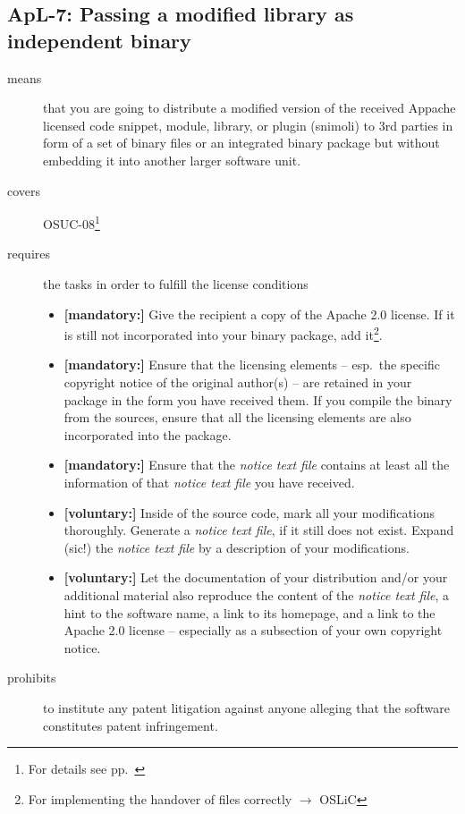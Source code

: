 \subsection{ApL-7: Passing a modified library as independent binary}

\begin{description}
\item[means] that you are going to distribute a modified version of the received
Appache licensed code snippet, module, library, or plugin (snimoli) to 3rd
parties in form of a set of binary files or an integrated binary package but
without embedding it into another larger software unit.
\item[covers] OSUC-08\footnote{For details see pp.\ \pageref{OSUC-08-DEF}}
\item[requires] the tasks in order to fulfill the license conditions
\begin{itemize}
  
 \item \textbf{[mandatory:]} Give the recipient a copy of the Apache 2.0
  license. If it is still not incorporated into your binary package, add
  it\footnote{For implementing the handover of files correctly $\rightarrow$
  OSLiC \pageref{DistributingFilesHint}}.
  
  \item \textbf{[mandatory:]} Ensure that the licensing elements -- esp.\ the
  specific copyright notice of the original author(s) -- are retained in your
  package in the form you have received them. If you compile the binary from the
  sources, ensure that all the licensing elements are also incorporated into the
  package.
  
  \item \textbf{[mandatory:]} Ensure that the \emph{notice text file} contains at least
  all the information of that \emph{notice text file} you have received.
   
  \item \textbf{[voluntary:]} Inside of the source code, mark all your
  modifications thoroughly. Generate a \emph{notice text file}, if it still does not
  exist. Expand (sic!) the \emph{notice text file} by a description of your
  modifications.
 
  \item \textbf{[voluntary:]} Let the documentation of your distribution and/or
  your additional material also reproduce the content of the \emph{notice text
  file}, a hint to the software name, a link to its homepage, and a link to the
  Apache 2.0 license -- especially as a subsection of your own copyright notice.
  
\end{itemize}

\item[prohibits] to institute any patent litigation against anyone alleging that
the software constitutes patent infringement.

\end{description}

